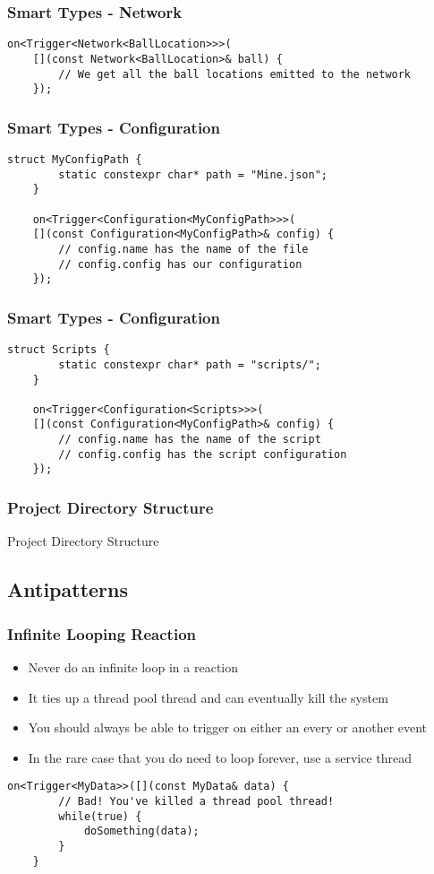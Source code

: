 \documentclass{beamer}
\begin{document}
\begin{frame}[fragile]
	\frametitle{Smart Types - Network}
	\begin{lstlisting}[language=nuclear]
	on<Trigger<Network<BallLocation>>>(
	[](const Network<BallLocation>& ball) {
		// We get all the ball locations emitted to the network
	});
	\end{lstlisting}
\end{frame}

\begin{frame}[fragile]
	\frametitle{Smart Types - Configuration}
	\begin{lstlisting}[language=nuclear]
	struct MyConfigPath {
		static constexpr char* path = "Mine.json";
	}
	
	on<Trigger<Configuration<MyConfigPath>>>(
	[](const Configuration<MyConfigPath>& config) {
		// config.name has the name of the file
		// config.config has our configuration
	});
	\end{lstlisting}
\end{frame}

\begin{frame}[fragile]
	\frametitle{Smart Types - Configuration}
	\begin{lstlisting}[language=nuclear]
	struct Scripts {
		static constexpr char* path = "scripts/";
	}
	
	on<Trigger<Configuration<Scripts>>>(
	[](const Configuration<MyConfigPath>& config) {
		// config.name has the name of the script
		// config.config has the script configuration
	});
	\end{lstlisting}
\end{frame}

\begin{frame}
	\frametitle{Project Directory Structure}
	Project Directory Structure
\end{frame}

\subsection{Antipatterns}
\begin{frame}[fragile]
	\frametitle{Infinite Looping Reaction}

	\begin{itemize}
		\item Never do an infinite loop in a reaction
		\item It ties up a thread pool thread and can eventually kill the system
		\item You should always be able to trigger on either an every or another event
		\item In the rare case that you do need to loop forever, use a service thread
	\end{itemize}

	\begin{lstlisting}[language=nuclear]
	on<Trigger<MyData>>([](const MyData& data) {
		// Bad! You've killed a thread pool thread!
		while(true) {
			doSomething(data);
		}
	}
	\end{lstlisting}
\end{frame}
\end{document}
